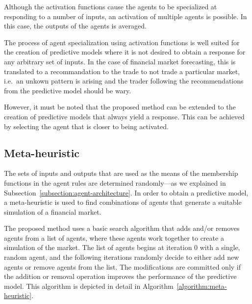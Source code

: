 \documentclass{ieeeaccess}
\begin{document}
Although the activation functions cause the agents to be specialized at
responding to a number of inputs, an activation of multiple agents is
possible. In this case, the outputs of the agents is averaged. %

The process of agent specialization using activation functions is well suited
for the creation of predictive models where it is not desired to obtain a
response for any arbitrary set of inputs. In the case of financial market
forecasting, this is translated to a recommandation to the trade to not trade a
particular market, i.e.\ an unkown pattern is arising and the trader following
the recommendations from the predictive model should be wary.

However, it must be noted that the proposed method can be extended to the
creation of predictive models that always yield a response. This can be
achieved by selecting the agent that is closer to being activated.



\subsection{Meta-heuristic} %
\label{subsection:meta-heuristic}

The sets of inputs and outputs that are used as the means of the
membership functions in the agent rules are determined randomly---as
we explained in Subsection~\ref{subsection:agent-architecture}. In
order to obtain a predictive model, a meta-heuristic is used to find
combinations of agents that generate a suitable simulation of a
financial market.

The proposed method uses a basic search algorithm that adds and/or removes
agents from a list of agents, where these agents work together to create a
simulation of the market. The list of agents begins at iteration 0 with a
single, random agent, and the following iterations randomly decide to either
add new agents or remove agents from the list. The modifications are committed
only if the addition or removal operation improves the performance of the
predictive model. This algorithm is depicted in detail in
Algorithm~\ref{algorithm:meta-heuristic}.
\end{document}

